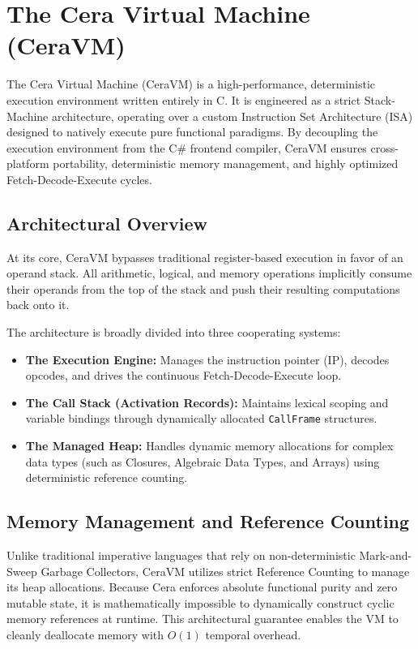 \documentclass[11pt, a4paper]{article}
\begin{document}
\section{The Cera Virtual Machine (CeraVM)}
\noindent
The Cera Virtual Machine (CeraVM) is a high-performance, deterministic execution environment written entirely in C. It is engineered as a strict Stack-Machine architecture, operating over a custom Instruction Set Architecture (ISA) designed to natively execute pure functional paradigms. By decoupling the execution environment from the C\# frontend compiler, CeraVM ensures cross-platform portability, deterministic memory management, and highly optimized Fetch-Decode-Execute cycles.

\subsection{Architectural Overview}
\noindent
At its core, CeraVM bypasses traditional register-based execution in favor of an operand stack. All arithmetic, logical, and memory operations implicitly consume their operands from the top of the stack and push their resulting computations back onto it. 

The architecture is broadly divided into three cooperating systems:
\begin{itemize}
    \item \textbf{The Execution Engine:} Manages the instruction pointer (IP), decodes opcodes, and drives the continuous Fetch-Decode-Execute loop.
    \item \textbf{The Call Stack (Activation Records):} Maintains lexical scoping and variable bindings through dynamically allocated \texttt{CallFrame} structures.
    \item \textbf{The Managed Heap:} Handles dynamic memory allocations for complex data types (such as Closures, Algebraic Data Types, and Arrays) using deterministic reference counting.
\end{itemize}

\subsection{Memory Management and Reference Counting}
\noindent
Unlike traditional imperative languages that rely on non-deterministic Mark-and-Sweep Garbage Collectors, CeraVM utilizes strict Reference Counting to manage its heap allocations. Because Cera enforces absolute functional purity and zero mutable state, it is mathematically impossible to dynamically construct cyclic memory references at runtime. This architectural guarantee enables the VM to cleanly deallocate memory with $O(1)$ temporal overhead.
\end{document}
